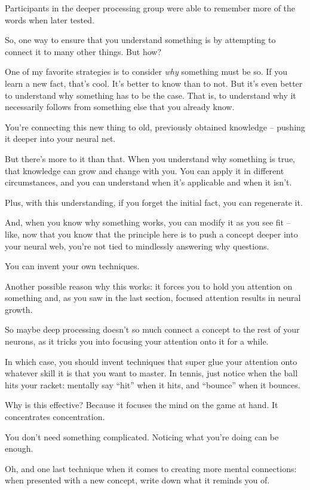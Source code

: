 Participants in the deeper processing group were able to remember more of the
words when later tested.\cite{craik1975depth}

So, one way to ensure that you understand something is by attempting to connect
it to many other things. But how?

One of my favorite strategies is to consider \textit{why} something must be
so. If you learn a new fact, that's cool. It's better to know than to
not. But it's even better to understand why something has to be the case. That is, to
understand why it necessarily follows from something else that you already know.

You're connecting this new thing to old, previously obtained knowledge --
pushing it deeper into your neural net.

But there's more to it than that. When you understand why something is true,
that knowledge can grow and change with you. You can apply it in different
circumstances, and you can understand when it's applicable and when it isn't.

Plus, with this understanding, if you forget the initial fact, you can
regenerate it.

And, when you know why something works, you can modify it as you see fit --
like, now that you know that the principle here is to push a concept
deeper into your neural web, you're not tied to mindlessly answering why
questions.

You can invent your own techniques.

Another possible reason why this works: it forces you to hold you
attention on something and, as you saw in the last section, focused attention
results in neural growth.

So maybe deep processing doesn't so much connect a concept to the rest of your
neurons, as it tricks you into focusing your attention onto it for a while.

In which case, you should invent techniques that super glue your attention onto
whatever skill it is that you want to master. In tennis, just notice when the
ball hits your racket: mentally say ``hit'' when it hits, and ``bounce'' when it
bounces.

Why is this effective? Because it focuses the mind on the game at hand. It
concentrates concentration.

You don't need something complicated. Noticing what you're doing can be enough.

Oh, and one last technique when it comes to creating more mental connections:
when presented with a new concept, write down what it reminds you of. 

